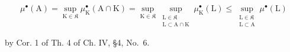 \[
\mu^{\bullet}(\mathrm{A}) = \sup_{\mathrm{K}\in \mathfrak{K}}\mu_{\mathrm{K}}^{\bullet}(\mathrm{A}\cap \mathrm{K}) = \sup_{\mathrm{K}\in \mathfrak{K}}\sup_{\substack{\mathrm{L}\in \mathfrak{K}\\ \mathrm{L}\subset \mathrm{A}\cap \mathrm{K}}}\mu_{\mathrm{K}}^{\bullet}(\mathrm{L})\leqslant \sup_{\substack{\mathrm{L}\in \mathfrak{K}\\ \mathrm{L}\subset \mathrm{A}}}\mu^{\bullet}(\mathrm{L})
\]

by Cor. 1 of Th. 4 of Ch. IV, §4, No.~6.

